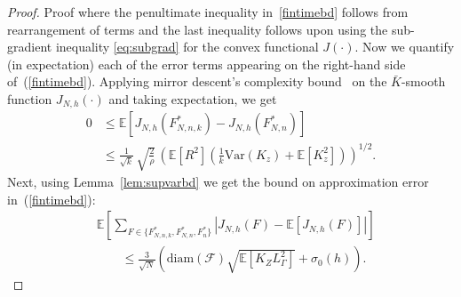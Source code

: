 \documentclass[11pt,leqno]{amsart}
\begin{document}
\begin{proof}{Proof}
where the penultimate inequality in~\eqref{fintimebd} follows from rearrangement of terms %
and the last inequality follows upon using the sub-gradient inequality \eqref{eq:subgrad} for the convex functional $J(\cdot)$. 
Now we quantify (in expectation) each of the error terms appearing on the right-hand side of~(\ref{fintimebd}). Applying mirror descent's complexity bound~\citep[pp. 80]{2015bub} on the $\bar{K}$-smooth function $J_{N,h}(\cdot)$ and taking expectation, we get %
\begin{equation}\label{expgradbound} 
\begin{aligned}
0 &\leq \mathbb{E}\left[ J_{N,h}(F^*_{N,n,k}) - J_{N,h}(F^*_{N,n})\right]\\&\leq \frac{1}{\sqrt{k}} \, \sqrt{\frac{2}{\rho}} \, \left(\mathbb{E}[R^2] \left( \frac{1}{k}\mbox{Var}(K_{z}) + \mathbb{E}[K_{z}^2]\right)\right)^{1/2}.    
\end{aligned}
\end{equation} Next, 
using Lemma~\ref{lem:supvarbd} we get the bound on approximation error in~(\ref{fintimebd}):  
\begin{equation}\label{mcerror} 
\begin{aligned}
&\mathbb{E}\left[\sum_{F \in \{F^*_{N,n,k}, F^*_{N,n}, F_{n}^*\}} \left | J_{N,h}(F) - \mathbb{E}\left[J_{N,h}(F)\right]\right | \right]\\
&\qquad\leq \frac{3 }{\sqrt{N}}\left(\mbox{diam}(\mathcal{F})\sqrt{\mathbb{E}[K_{Z} L_\Gamma^2]} + \sigma_0(h) \right).    

\end{aligned}
\end{equation}
\end{proof}
\end{document}
